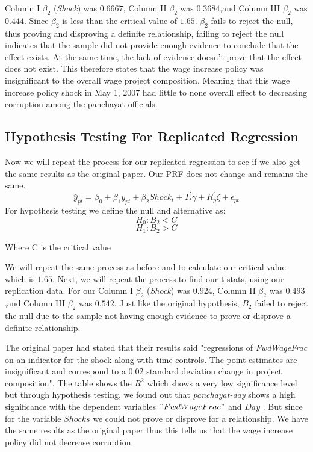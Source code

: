 \documentclass[12pt]{article}
\begin{document}
Column I $\beta_2$ (\emph{Shock}) was $0.6667$, Column II $\beta_2$  was $0.3684$,and Column III $\beta_2$ was $0.444$. Since $\beta_2$ is less than the critical value of $1.65$. $\beta_2$ fails to reject the null, thus proving and disproving a definite relationship, failing to reject the null indicates that the sample did not provide enough evidence to conclude that the effect exists. At the same time, the lack of evidence doesn't prove that the effect does not exist. 
This therefore states that the wage increase policy was insignificant to the overall wage project composition. Meaning that this wage increase policy shock in May 1, 2007 had little to none overall effect to decreasing corruption among the panchayat officials.
\subsection{Hypothesis Testing For Replicated Regression}
Now we will repeat the process for our replicated regression to see if we also get the same results as the original paper. Our PRF does not change and remains the same.
$$\hat{y}_{pt}= \beta_0 + \beta_1 y_{pt} + \beta_2Shock_t + T^{'}_t\gamma + R^{'}_p\zeta  + \epsilon_{pt}  $$
\newline
For hypothesis testing we define the null and alternative as:
\newline
$$H_0:B_2 < C$$
$$H_1:B_2 > C$$
\begin{center}
Where C is the critical value
\end{center}

We will repeat the same process as before and to calculate our critical value
which is $1.65$. Next, we will repeat the process to find our t-stats, using our replication data. For our Column I $\beta_2$ (\emph{Shock}) was $0.924$, Column II $\beta_2$  was $0.493$,and Column III $\beta_2$ was $0.542$. Just like the original hypothesis, $B_2$ failed to reject the null due to the sample not having enough evidence to prove or disprove a definite relationship. 

The original paper had stated that their results said "regressions of \emph{FwdWageFrac} on an indicator for the shock along with time controls. The point estimates are insignificant and correspond to a 0.02 standard deviation change in project composition". The table shows the $R^2$ which shows a very low significance level but through hypothesis testing, we found out that \emph{panchayat-day} shows a high significance with the dependent variables $"FwdWageFrac"$ and $Day$ . But since for the variable $Shocks$ we could not prove or disprove for a relationship. We have the same results as the original paper thus this tells us that the wage increase policy did not decrease corruption. 
\end{document}
